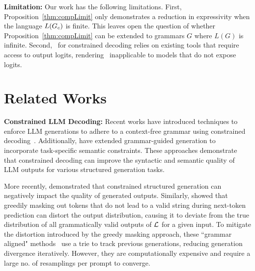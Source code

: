 \textbf{Limitation: }Our work has the following limitations.
First, Proposition~\ref{thm:compLimit} only demonstrates a reduction in expressivity when the language \( L(G_c) \) is finite. 
This leaves open the question of whether Proposition~\ref{thm:compLimit} can be extended to grammars \( G \) where \( L(G) \) is infinite. 
Second, \Tool\ for constrained decoding relies on existing tools \cite{syncode} that require access to output logits, rendering \Tool\ inapplicable to models that do not expose logits.
\vspace{-5pt}
\section{Related Works}
\textbf{Constrained LLM Decoding:}
Recent works have introduced techniques to enforce LLM generations to adhere to a context-free grammar using constrained decoding~\cite{ugare2024syncodellmgenerationgrammar, willard2023efficient, beurerkellner2024guiding, melcer2024constraineddecodingfillinthemiddlecode}.
Additionally, \citet{poesia2022synchromesh, ugare2024itergeniterativestructuredllm} have extended grammar-guided generation to incorporate task-specific semantic constraints. 
These approaches demonstrate that constrained decoding can improve the syntactic and semantic quality of LLM outputs for various structured generation tasks.

More recently, \citet{speakFree} demonstrated that constrained structured generation can negatively impact the quality of generated outputs. Similarly, \citet{park2024grammaraligneddecoding} showed that greedily masking out tokens that do not lead to a valid string during next-token prediction can distort the output distribution, causing it to deviate from the true distribution of all grammatically valid outputs of $\mathcal{L}$ for a given input.
To mitigate the distortion introduced by the greedy masking approach, these ``grammar aligned" methods~\cite{park2024grammaraligneddecoding, melcer2024approximatelyaligneddecoding} use a trie to track previous generations, reducing generation divergence iteratively. 
However, they are computationally expensive and require a large no. of resamplings per prompt to converge.

